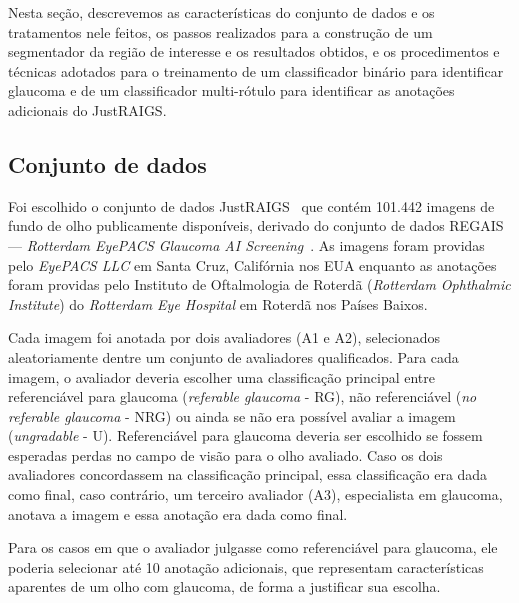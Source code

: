 \documentclass[12pt]{article}
\begin{document}
Nesta seção, descrevemos as características do conjunto de dados e os tratamentos nele feitos, os passos realizados para a construção de um segmentador da região de interesse e os resultados obtidos, e os procedimentos e técnicas adotados para o treinamento de um classificador binário para identificar glaucoma e de um classificador multi-rótulo para identificar as anotações adicionais do JustRAIGS.

\subsection{Conjunto de dados}
\label{sec:dataset}

Foi escolhido o conjunto de dados JustRAIGS~\cite{justraigs} que contém 101.442 imagens de fundo de olho publicamente disponíveis, derivado do conjunto de dados REGAIS --- \emph{Rotterdam EyePACS Glaucoma AI Screening}~\cite{justraigs_article}. As imagens foram providas pelo \emph{EyePACS LLC} em Santa Cruz, Califórnia nos EUA enquanto as anotações foram providas pelo Instituto de Oftalmologia de Roterdã (\emph{Rotterdam Ophthalmic Institute}) do \emph{Rotterdam Eye Hospital} em Roterdã nos Países Baixos.

Cada imagem foi anotada por dois avaliadores (A1 e A2), selecionados aleatoriamente dentre um conjunto de avaliadores qualificados. 
Para cada imagem, o avaliador deveria escolher uma classificação principal entre referenciável para glaucoma (\emph{referable glaucoma} - RG), não referenciável (\emph{no referable glaucoma} - NRG) ou ainda se não era possível avaliar a imagem (\emph{ungradable} - U). Referenciável para glaucoma deveria ser escolhido se fossem esperadas perdas no campo de visão para o olho avaliado.
Caso os dois avaliadores concordassem na classificação principal, essa classificação era dada como final, caso contrário, um terceiro avaliador (A3), especialista em glaucoma, anotava a imagem e essa anotação era dada como final.~\cite{justraigs_article}

Para os casos em que o avaliador julgasse como referenciável para glaucoma, ele poderia selecionar até 10 anotação adicionais, que representam características aparentes de um olho com glaucoma, de forma a justificar sua escolha. \cite{justraigs_article}
\end{document}
